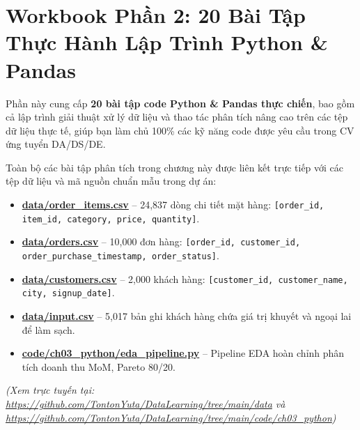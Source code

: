 \chapter{Workbook Phần 2: 20 Bài Tập Thực Hành Lập Trình Python \& Pandas}

\begin{lythuyetbox}
Phần này cung cấp \textbf{20 bài tập code Python \& Pandas thực chiến}, bao gồm cả lập trình giải thuật xử lý dữ liệu và thao tác phân tích nâng cao trên các tệp dữ liệu thực tế, giúp bạn làm chủ 100\% các kỹ năng code được yêu cầu trong CV ứng tuyển DA/DS/DE.
\end{lythuyetbox}

\begin{thuchanhbox}
Toàn bộ các bài tập phân tích trong chương này được liên kết trực tiếp với các tệp dữ liệu và mã nguồn chuẩn mẫu trong dự án:
\begin{itemize}
    \item \href{run:./data/order_items.csv}{\Large\textbf{\color{navyprimary}data/order\_items.csv}} -- 24,837 dòng chi tiết mặt hàng: \texttt{[order\_id, item\_id, category, price, quantity]}.
    \item \href{run:./data/orders.csv}{\Large\textbf{\color{navyprimary}data/orders.csv}} -- 10,000 đơn hàng: \texttt{[order\_id, customer\_id, order\_purchase\_timestamp, order\_status]}.
    \item \href{run:./data/customers.csv}{\Large\textbf{\color{navyprimary}data/customers.csv}} -- 2,000 khách hàng: \texttt{[customer\_id, customer\_name, city, signup\_date]}.
    \item \href{run:./data/input.csv}{\Large\textbf{\color{navyprimary}data/input.csv}} -- 5,017 bản ghi khách hàng chứa giá trị khuyết và ngoại lai để làm sạch.
    \item \href{run:./code/ch03_python/eda_pipeline.py}{\Large\textbf{\color{navyprimary}code/ch03\_python/eda\_pipeline.py}} -- Pipeline EDA hoàn chỉnh phân tích doanh thu MoM, Pareto 80/20.
\end{itemize}
\small\textit{(Xem trực tuyến tại: \url{https://github.com/TontonYuta/DataLearning/tree/main/data} và \url{https://github.com/TontonYuta/DataLearning/tree/main/code/ch03_python})}
\end{thuchanhbox}

